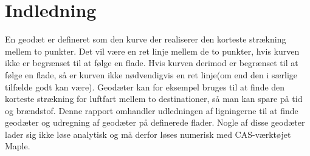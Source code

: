 \section{Indledning}

En geodæt er defineret som den kurve der realiserer den korteste strækning mellem to punkter. Det vil være en ret linje mellem de to punkter, hvis kurven ikke er begrænset til at følge en flade. Hvis kurven derimod er begrænset til at følge en flade, så er kurven ikke nødvendigvis en ret linje(om end den i særlige tilfælde godt kan være). Geodæter kan for eksempel bruges til at finde den korteste strækning for luftfart mellem to destinationer, så man kan spare på tid og brændstof. Denne rapport omhandler udledningen af ligningerne til at finde geodæter og udregning af geodæter på definerede flader. Nogle af disse geodæter lader sig ikke løse analytisk og må derfor løses numerisk med CAS-værktøjet Maple.